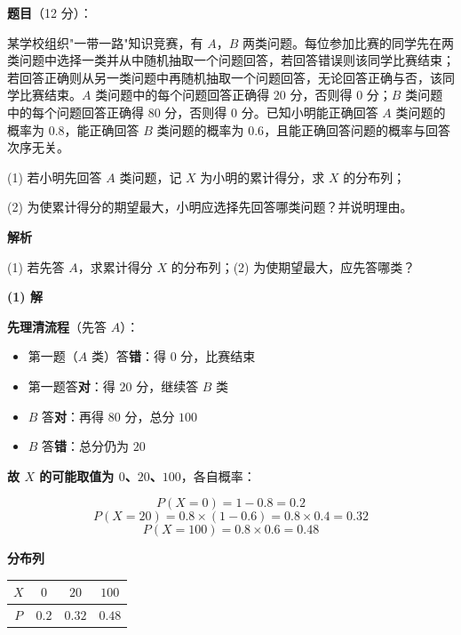 \begin{answer}

\textbf{题目}（12 分）：

某学校组织"一带一路"知识竞赛，有 $A$，$B$ 两类问题。每位参加比赛的同学先在两类问题中选择一类并从中随机抽取一个问题回答，若回答错误则该同学比赛结束；若回答正确则从另一类问题中再随机抽取一个问题回答，无论回答正确与否，该同学比赛结束。$A$ 类问题中的每个问题回答正确得 $20$ 分，否则得 $0$ 分；$B$ 类问题中的每个问题回答正确得 $80$ 分，否则得 $0$ 分。已知小明能正确回答 $A$ 类问题的概率为 $0.8$，能正确回答 $B$ 类问题的概率为 $0.6$，且能正确回答问题的概率与回答次序无关。

  (1) 若小明先回答 $A$ 类问题，记 $X$ 为小明的累计得分，求 $X$ 的分布列；

  (2) 为使累计得分的期望最大，小明应选择先回答哪类问题？并说明理由。

\textbf{解析}

  (1) 若先答 $A$，求累计得分 $X$ 的分布列；(2) 为使期望最大，应先答哪类？

\par\medskip

\textbf{(1) 解}

\textbf{先理清流程}（先答 $A$）：

\begin{itemize}
\item 第一题（$A$ 类）答\textbf{错}：得 $0$ 分，比赛结束
\item 第一题答\textbf{对}：得 $20$ 分，继续答 $B$ 类
\item $B$ 答\textbf{对}：再得 $80$ 分，总分 $100$
\item $B$ 答\textbf{错}：总分仍为 $20$
\end{itemize}

\textbf{故 $X$ 的可能取值为 $0$、$20$、$100$}，各自概率：

\nopagebreak[4]
\[P(X=0)=1-0.8=0.2\]
\nopagebreak[4]
\[P(X=20)=0.8\times(1-0.6)=0.8\times0.4=0.32\]
\nopagebreak[4]
\[P(X=100)=0.8\times0.6=0.48\]

\textbf{分布列}

\begin{center}
\begin{tabular}{cccc}
\toprule
$X$ & $0$ & $20$ & $100$ \\
\midrule
$P$ & $0.2$ & $0.32$ & $0.48$ \\
\bottomrule
\end{tabular}
\end{center}


\end{answer}
